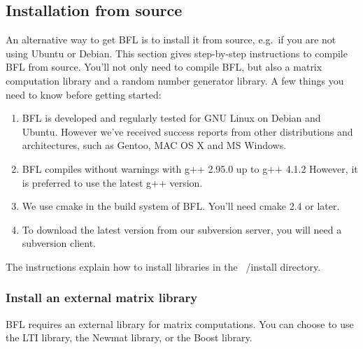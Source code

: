 \documentclass[a4paper,10pt]{article}
\begin{document}
\subsection{Installation from source}
\label{subsec:source}
An alternative way to get BFL is to install it from source, e.g.~if
you are not using Ubuntu or Debian. This section gives step-by-step
instructions to compile BFL from source. You'll not only need to
compile BFL, but also a matrix computation library and a random number
generator library. A few things you need to know before getting
started:
\begin{enumerate}
\item BFL is developed and regularly tested for GNU Linux on
  Debian and Ubuntu. However we've received success reports from other
  distributions and architectures, such as Gentoo, MAC OS X and MS
  Windows.
\item BFL compiles without warnings with g++ 2.95.0 up to g++ 4.1.2
  However, it is preferred to use the latest g++ version.
\item We use cmake in the build system of BFL. You'll need cmake 2.4
  or later.
\item To download the latest version from our subversion server, you
  will need a subversion client.
\end{enumerate}
The instructions explain how to install libraries in the ~/install
directory.

\subsubsection{Install an external matrix library}
\label{subsec:matrix}
BFL requires an external library for matrix computations. You can
choose to use the LTI library, the Newmat library, or the Boost library.
\end{document}
